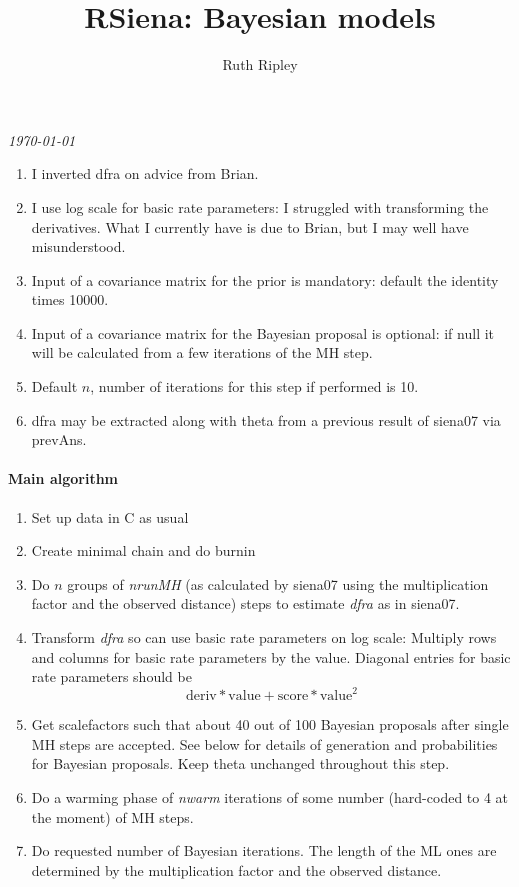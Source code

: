 \documentclass[12pt,a4paper]{article}
\renewcommand{\=}{\,=\,}
\newcommand{\+}{\,+\,}
\newcommand{\nnm}[1]{\textsf{\small\textit{#1}}}
\begin{document}
\title{RSiena: Bayesian models}
\author{Ruth Ripley}
\date{}
\maketitle

\centerline{\emph{\today}}
\bigskip
\begin{enumerate}
\item I inverted dfra on advice from Brian.
\item I use log scale for basic rate parameters: I struggled with transforming
  the derivatives. What I currently have is due to Brian, but I may well have
  misunderstood.
\item Input of a covariance matrix for the prior is mandatory: default the
  identity times 10000.
\item Input of a covariance matrix for the Bayesian proposal is optional: if
  null it will be calculated from a few iterations of the MH step.
\item Default $n$, number of iterations for this step if performed is 10.
\item dfra may be extracted along with theta from a previous result of siena07
via prevAns.
\end{enumerate}
\paragraph{Main algorithm}
\begin{enumerate}
  \item Set up data in C as usual
  \item Create minimal chain and do burnin
  \item Do $n$ groups of \nnm{nrunMH} (as calculated by siena07 using the
    multiplication factor and the observed distance) steps to
  estimate \nnm{dfra} as in siena07.
  \item Transform \nnm{dfra} so can use basic rate parameters on log scale:
Multiply rows and columns for basic rate parameters by the value. Diagonal
entries for basic rate parameters should be
$$ \textrm{deriv} * \textrm{value} + \textrm{score} * \textrm{value}^2 $$
  \item Get scalefactors such that about 40 out of 100 Bayesian proposals after
  single MH steps are accepted. See below for details of generation and
  probabilities for Bayesian proposals. Keep theta unchanged throughout this
  step.
\item Do a warming phase of \nnm{nwarm} iterations of some number (hard-coded to
  4 at the moment) of MH steps.
\item Do requested number of Bayesian iterations. The
  length of the ML ones are determined by the multiplication factor and the
  observed distance.
\end{enumerate}
\end{document}
